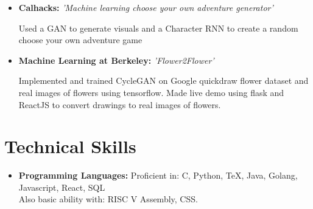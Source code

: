 \documentclass[11pt,letterpaper,sans]{moderncv}        %
\begin{document}
\begin{itemize}

\item{\textbf{Calhacks:} \textit{'Machine learning choose your own adventure generator'}

\vspace{3pt}
\small{Used a GAN to generate visuals and a Character RNN to create a random choose your own adventure game}}
\iffalse
\item{\textbf{Developer Camp Best Education Hack:} \textit{'Splash Game'}

\vspace{3pt}

\small{Used Pixi Library to create a Javascript infinite runner game to teach children about the water cycle and the importance of conservation}}
\fi
\item{\textbf{Machine Learning at Berkeley:} \textit{'Flower2Flower'}

\vspace{3pt}

        \small{Implemented and trained CycleGAN on Google quickdraw flower dataset and real images of flowers using tensorflow. Made live demo using flask and ReactJS to convert drawings to real images of flowers.}}
\end{itemize}

\section{Technical Skills}

\vspace{3pt}

\begin{itemize}

\item \textbf{Programming Languages:} Proficient in: C, Python, TeX, Java, Golang, Javascript, React, SQL \\ Also basic ability with: RISC V Assembly, CSS.

\end{itemize}


\nocite{*}



\end{document}
